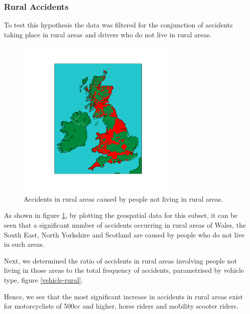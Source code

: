 \documentclass[12pt]{article}
\begin{document}
\subsubsection{Rural Accidents}

To test this hypothesis the data was filtered for the conjunction of accidents taking place in rural areas and drivers who do not live in rural areas. 

\begin{figure}[h]
\centering     %
\includegraphics[width=0.70\textwidth]{rural_accidents}
\caption{Accidents in rural areas caused by people not living in rural areas.}
\label{rural-uk}
\end{figure}

As shown in figure \ref{rural-uk}, by plotting the geospatial data for this subset, it can be seen that a significant number of accidents occurring in rural areas of Wales, the South East, North Yorkshire and Scotland are caused by people who do not live in such areas.

\newpage

Next, we determined the ratio of accidents in rural areas involving people not living in those areas to the total frequency of accidents, parametrised by vehicle type, figure \ref{vehicle-rural}.

Hence, we see that the most significant increase in accidents in rural areas exist for motorcyclists of 500cc and higher, horse riders and mobility scooter riders.

\newpage
\end{document}
